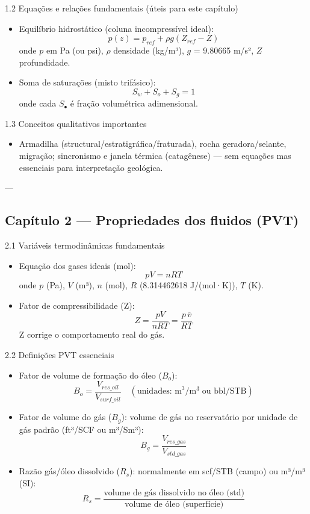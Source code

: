 \documentclass[11pt,a4paper]{article}
\begin{document}
1.2 Equações e relações fundamentais (úteis para este capítulo)
\begin{itemize}
\item Equilíbrio hidrostático (coluna incompressível ideal):
$$p(z)=p_{ref}+\rho g (Z_{ref}-Z)$$
onde $p$ em Pa (ou psi), $\rho$ densidade (kg/m³), $g$ = 9.80665 m/s², $Z$ profundidade.
\item Soma de saturações (misto trifásico):
$$S_w + S_o + S_g = 1$$
onde cada $S_\bullet$ é fração volumétrica adimensional.
\end{itemize}

1.3 Conceitos qualitativos importantes
\begin{itemize}
\item Armadilha (structural/estratigráfica/fraturada), rocha geradora/selante, migração; sincronismo e janela térmica (catagênese) — sem equações mas essenciais para interpretação geológica.
\end{itemize}

---

\subsection{Capítulo 2 — Propriedades dos fluidos (PVT)}

2.1 Variáveis termodinâmicas fundamentais
\begin{itemize}
\item Equação dos gases ideais (mol):
$$pV=nRT$$
onde $p$ (Pa), $V$ (m³), $n$ (mol), $R$ (8.314462618 J/(mol·K)), $T$ (K).
\item Fator de compressibilidade (Z):
$$Z=\dfrac{pV}{nRT}=\dfrac{p\,\overline{v}}{RT}$$
Z corrige o comportamento real do gás.
\end{itemize}

2.2 Definições PVT essenciais
\begin{itemize}
\item Fator de volume de formação do óleo ($B_o$):
$$B_o=\dfrac{V_{res\_oil}}{V_{surf\_oil}}\quad(\text{unidades: m}^3/\text{m}^3\;\text{ou bbl/STB})$$
\item Fator de volume do gás ($B_g$): volume de gás no reservatório por unidade de gás padrão (ft³/SCF ou m³/Sm³):
$$B_g=\dfrac{V_{res\_gas}}{V_{std\_gas}}$$
\item Razão gás/óleo dissolvido ($R_s$): normalmente em scf/STB (campo) ou m³/m³ (SI):
$$R_s=\dfrac{\text{volume de gás dissolvido no óleo (std)}}{\text{volume de óleo (superfície)}}$$
\end{itemize}
\end{document}
